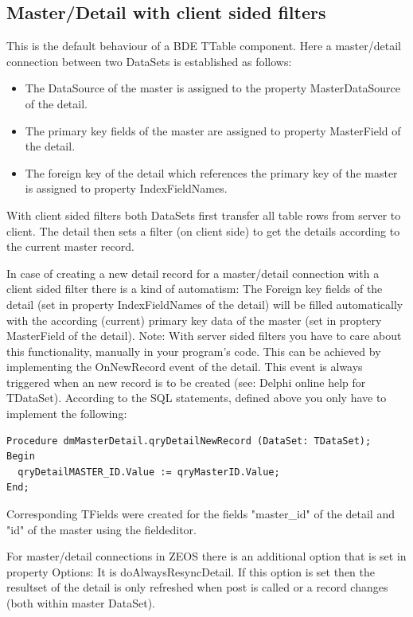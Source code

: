 \documentclass[a4paper,12pt,oneside]{book}
\begin{document}
\subsection{Master/Detail with client sided filters}
This is the default behaviour of a BDE TTable component. Here a master/detail connection between two DataSets is established as follows:

\begin{itemize}
  \item The DataSource of the master is assigned to the property MasterDataSource of the detail.
  \item The primary key fields of the master are assigned to property MasterField of the detail.
  \item The foreign key of the detail which references the primary key of the master is assigned to property IndexFieldNames.
\end{itemize}

With client sided filters both DataSets first transfer all table rows from server to client.
The detail then sets a filter (on client side) to get the details according to the current master record.

In case of creating a new detail record for a master/detail connection with a client sided filter there is a kind of automatism:
The Foreign key fields of the detail (set in property IndexFieldNames of the detail) will be filled automatically with the according (current) primary key data of the master (set in proptery MasterField of the detail).
Note: With server sided filters you have to care about this functionality, manually in your program's code.
This can be achieved by implementing the OnNewRecord event of the detail.
This event is always triggered when an new record is to be created (see: Delphi online help for TDataSet).
According to the SQL statements, defined above you only have to implement the following:

\begin{verbatim}
Procedure dmMasterDetail.qryDetailNewRecord (DataSet: TDataSet);
Begin
  qryDetailMASTER_ID.Value := qryMasterID.Value;
End;
\end{verbatim}

Corresponding TFields were created for the fields "master\_id" of the detail and "id" of the master using the fieldeditor.

For master/detail connections in ZEOS there is an additional option that is set in property Options: It is doAlwaysResyncDetail.
If this option is set then the resultset of the detail is only refreshed when post is called or a record changes (both within master DataSet).
\end{document}
